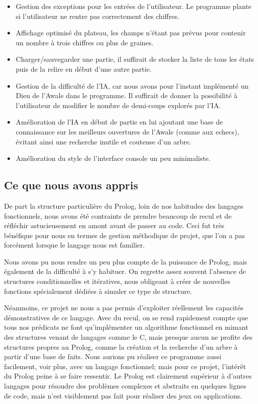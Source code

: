 \documentclass[]{article}
\begin{document}
\begin{itemize}
\item Gestion des exceptions pour les entrées de l'utilisateur. Le programme plante si l'utilisateur ne rentre pas correctement des chiffres.
\item Affichage optimisé du plateau, les champs n'étant pas prévus pour contenir un nombre à trois chiffres ou plus de graines. 
\item Charger/sauvegarder une partie, il suffirait de stocker la liste de tous les états puis de la relire en début d'une autre partie.
\item Gestion de la difficulté de l'IA, car nous avons pour l'instant implémenté un Dieu de l'Awale dans le programme. Il suffirait de donner la possibilité à l'utilisateur de modifier le nombre de demi-coups explorés par l'IA.
\item Amélioration de l'IA en début de partie en lui ajoutant une base de connaissance sur les meilleurs ouvertures de l'Awale (comme aux echecs), évitant ainsi une recherche inutile et couteuse d'un arbre.
\item Amélioration du style de l'interface console un peu minimaliste.
\end{itemize}

\subsection{Ce que nous avons appris}

De part la structure particulière du Prolog, loin de nos habitudes des langages fonctionnels, nous avons été contraints de prendre beaucoup de recul et de réfléchir astucieusement en amont avant de passer au code. Ceci fut très bénéfique pour nous en termes de gestion méthodique de projet, que l'on a pas forcément lorsque le langage nous est familier.

Nous avons pu nous rendre un peu plus compte de la puissance de Prolog, mais également de la difficulté à s'y habituer. On regrette assez souvent l'absence de structures conditionnelles et itératives, nous obligeant à créer de nouvelles fonctions spécialement dédiées à simuler ce type de structure.

Néanmoins, ce projet ne nous a pas permis d'exploiter réellement les capacités démonstratives de ce langage. Avec du recul, on se rend rapidement compte que tous nos prédicats ne font qu'implémenter un algorithme fonctionnel en mimant des structures venant de langages comme le C, mais presque aucun ne profite des structures propres au Prolog, comme la création et la recherche d'un arbre à partir d'une base de faits. Nous aurions pu réaliser ce programme aussi facilement, voir plus, avec un langage fonctionnel; mais pour ce projet, l'intérêt du Prolog peine à se faire ressentir. Le Prolog est clairement supérieur à d'autres langages pour résoudre des problèmes complexes et abstraits en quelques lignes de code, mais n'est visiblement pas fait pour réaliser des jeux ou applications.
\end{document}
